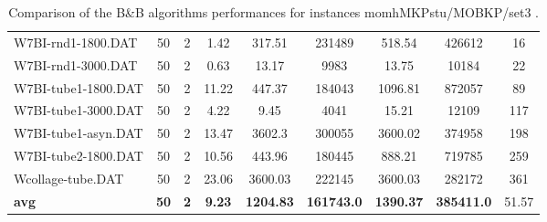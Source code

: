 \begin{table}[!ht]
{\begin{tabular}{lcccccccc}
W7BI-rnd1-1800.DAT & 50 & 2 &  \textcolor{blue2}{1.42} & 317.51 & 231489 & 518.54 & 426612 & 16 \\
W7BI-rnd1-3000.DAT & 50 & 2 &  \textcolor{blue2}{0.63} & 13.17 & 9983 & 13.75 & 10184 & 22 \\
W7BI-tube1-1800.DAT & 50 & 2 &  \textcolor{blue2}{11.22} & 447.37 & 184043 & 1096.81 & 872057 & 89 \\
W7BI-tube1-3000.DAT & 50 & 2 &  \textcolor{blue2}{4.22} & 9.45 & 4041 & 15.21 & 12109 & 117 \\
W7BI-tube1-asyn.DAT & 50 & 2 &  \textcolor{blue2}{13.47} & 3602.3 & 300055 & 3600.02 & 374958 & 198 \\
W7BI-tube2-1800.DAT & 50 & 2 &  \textcolor{blue2}{10.56} & 443.96 & 180445 & 888.21 & 719785 & 259 \\
Wcollage-tube.DAT & 50 & 2 &  \textcolor{blue2}{23.06} & 3600.03 & 222145 & 3600.03 & 282172 & 361 \\
\cline{1-9} \textbf{avg} & \textbf{50} & \textbf{2} & \textbf{9.23} & \textbf{1204.83} & \textbf{161743.0} & \textbf{1390.37} & \textbf{385411.0} & 51.57\\ \cline{1-9}
\bottomrule
\end{tabular}
}%
\caption{Comparison of the B\&B algorithms performances for instances momhMKPstu/MOBKP/set3 .}
\label{tab:table_compareBB_momhMKPstu/MOBKP/set3 }
\end{table}

